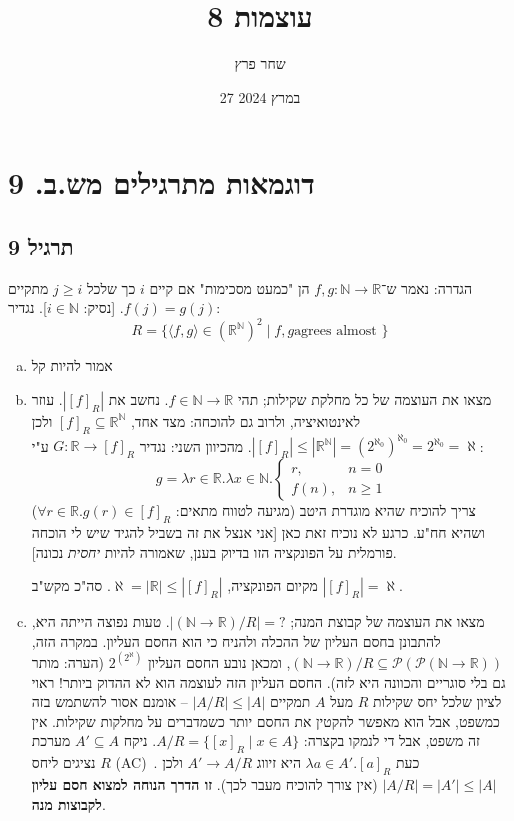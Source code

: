 \documentclass[]{article}
\title{עוצמות 8}
\author{שחר פרץ}
\date{27 במרץ 2024}
\newcommand\N     {\mathbb{N}}
\newcommand\R     {\mathbb{R}}
\newcommand\ps    {\mathcal{P}}
\newcommand\ra    {\rangle}
\newcommand\la    {\langle}
\newcommand\uaz   {^{\aleph_0}}
\newcommand\al    {\aleph}
\newcommand\taz   {2^{\aleph_0}}
\newcommand\utal  { ^{\left (2^{\aleph} \right )}}
\newcommand\del   {$ \!\! $}
\begin{document}
	\maketitle
	
	\section{דוגמאות מתרגילים מש.ב. 9}
	\subsection{תרגיל 9}
	הגדרה: נאמר ש־$ f, g \colon \N \to \R $ הן "כמעט מסכימות" אם קיים $ i $ כך שלכל $ j \ge i $ מתקיים $ f(j) = g(j) $. [נסיק: $ i \in \N $]. 
	נגדיר: 
	\[ R = \{\la f, g \ra \in (\R^\N)^2 \mid f, g \text{agrees \ almost } \} \]
	\begin{enumerate}[(a)]
		\item אמור להיות קל
		\item מצאו את העוצמה של כל מחלקת שקילות; תהי $ f \in \N \to \R $. נחשב את $ |[f]_R| $. עוזר לאינטואיציה, ולרוב גם להוכחה: מצד אחד, $ [f]_R \subseteq \R^\N $ ולכן $ |[f]_R| \le |\R^\N| = (\taz)\uaz = \taz =\al $. מהכיוון השני: נגדיר $ G \colon \R\to [f]_R $ ע"י: 
		\[ g = \lambda r \in \R. \lambda x \in \N. \begin{cases}
			r, & n = 0 \\
			f(n), & n \ge 1
		\end{cases} \]
		צריך להוכיח שהיא מוגדרת היטב (מגיעה לטווח מתאים: $ \forall r \in \R. g(r) \in [f]_R $) ושהיא חח"ע. כרגע לא נוכיח זאת כאן [אני אנצל את זה בשביל להגיד שיש לי הוכחה פורמלית על הפונקציה הזו בדיוק בענן, שאמורה להיות \textit{יחסית} נכונה]. 
		
		מקיום הפונקציה, $ \al = |\R| \le |[f]_R| $. סה"כ מקש"ב $ |[f]_R| = \al $. 
		\item מצאו את העוצמה של קבוצת המנה; $ |(\N \to \R) / R| = ? $. טעות נפוצה הייתה היא, להתבונן בחסם העליון של ההכלה ולהניח כי הוא החסם העליון. במקרה הזה, $ (\N \to \R) / R \subseteq \ps(\ps(\N \to \R)) $, ומכאן נובע החסם העליון $ 2\utal $ (הערה: מותר גם בלי סוגריים והכוונה היא לזה). החסם העליון הזה לעוצמה הוא לא ההדוק ביותר! ראוי לציון שלכל יחס שקילות $ R $ מעל $ A $ תמקיים $ |A / R| \le |A| $ – אומנם אסור להשתמש בזה כמשפט, אבל הוא מאפשר להקטין את החסם יותר כשמדברים על מחלקות שקילות. אין זה משפט, אבל די לנמקו בקצרה: $ A / R = \{[x]_R \mid x \in A\} $. ניקח $ A' \subseteq A $ מערכת נציגים ליחס $ R $ (AC)\ \del . כעת $ \lambda a \in A'. [a]_R $ היא זיווג $ A' \to A / R $ ולכן $ |A/R| = |A'| \le |A| $ (אין צורך להוכיח מעבר לכך). \textbf{זו הדרך הנוחה למצוא חסם עליון לקבוצות מנה}. 
		

\end{enumerate}
\end{document}
